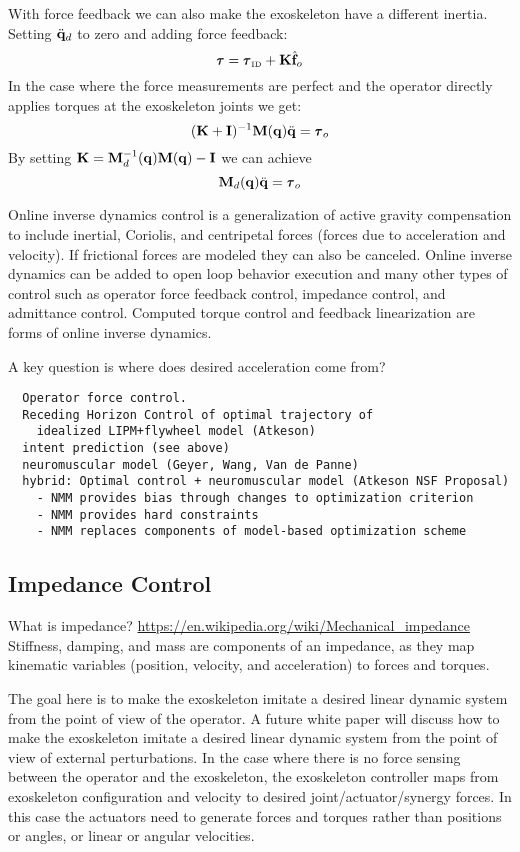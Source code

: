 \documentclass[letterpaper,12pt,fullpage]{article}
\newcommand{\invdyn}{{\mbox {\tiny ID}}}
\begin{document}
With force feedback we can also make the exoskeleton have a different inertia.
Setting $\ddot{{\bf q}}_d$ to zero and adding force feedback:
\begin{equation}
\vtau = \vtau_{\invdyn} + \mK \hat{\vf}_o
\end{equation}
In the case where the force measurements are perfect and 
the operator directly applies torques at the
exoskeleton joints we get:
\begin{equation}
(\mK + \mI)^{-1} \mM (\vq) \ddot{\vq} = \vtau_o
\end{equation}
By setting ${\bf K} = {\bf M}^{-1}_d ({\bf q}) {\bf M} ({\bf q}) - {\bf I}$ we can achieve
\begin{equation}
\mM_d (\vq) \ddot{\vq} = \vtau_o
\end{equation}

Online inverse dynamics control is a generalization of active gravity compensation to include
inertial, Coriolis, and centripetal forces (forces due to acceleration and
velocity).
If frictional forces are modeled they can also be canceled.
Online inverse dynamics can be added to open loop behavior execution
and many other types of control such as operator force
feedback control, impedance control, and admittance control.
Computed torque control and feedback linearization are forms of online
inverse dynamics.

A key question is where does desired acceleration come from?
\begin{verbatim}
  Operator force control.
  Receding Horizon Control of optimal trajectory of 
    idealized LIPM+flywheel model (Atkeson)
  intent prediction (see above)
  neuromuscular model (Geyer, Wang, Van de Panne)
  hybrid: Optimal control + neuromuscular model (Atkeson NSF Proposal)
    - NMM provides bias through changes to optimization criterion
    - NMM provides hard constraints
    - NMM replaces components of model-based optimization scheme
\end{verbatim}

\subsection{Impedance Control}

What is impedance?
\url{https://en.wikipedia.org/wiki/Mechanical_impedance}
Stiffness, damping, and mass are components of an impedance, as
they map kinematic variables (position, velocity, and acceleration)
to forces and torques.

The goal here is to make the exoskeleton imitate a desired linear dynamic system
from the point of view of the operator.
A future white paper will discuss how to make the exoskeleton 
imitate a desired linear dynamic system 
from the point of view of external perturbations.
In the case where there is no force sensing between the operator and the
exoskeleton, the exoskeleton controller maps from exoskeleton configuration
and velocity to desired joint/actuator/synergy forces.
In this case the actuators need to generate forces and torques rather than
positions or angles, or linear or angular velocities.
\end{document}
